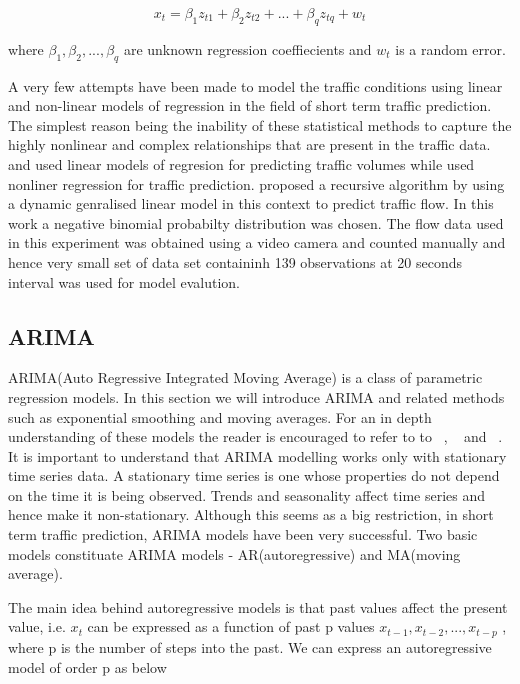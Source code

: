         \begin{equation}
            x_{t} = \beta_{1}z_{t1} + \beta_{2}z_{t2} + ... + \beta_{q}z_{tq} + w_{t}
        \end{equation}

where $ \beta_{1}, \beta_{2},...,\beta_{q} $ are unknown regression coeffiecients and $w_{t}$ is
a random error.

A very few attempts have been made to model the traffic conditions using linear and non-linear
models of regression in the field of short term traffic prediction. The simplest reason being the
inability of these statistical methods to capture the highly nonlinear and complex relationships that
are present in the traffic data.
\citet{low1972new} and \citet{jensen1973calibrating} used linear models of regresion for predicting
traffic volumes while \citet{hogberg1976estimation} used nonliner regression for traffic prediction.
\citet{lan1999real} proposed a recursive algorithm by using a dynamic genralised linear model
in this context to predict traffic flow. In this work a negative binomial probabilty distribution
was chosen. The flow data used in this experiment was obtained using a video camera and counted
manually and hence very small set of data set containinh 139 observations at 20 seconds interval
was used for model evalution.

\subsection{ARIMA}
ARIMA(Auto Regressive Integrated Moving Average) is a class of parametric regression models. In
this section we will introduce ARIMA and related methods such as exponential smoothing and moving
averages. For an in depth understanding of these models the reader is encouraged to refer to to
~\citet{tong1990non}, ~\citet{brockwell2006introduction} and ~\citet{box2015time}. It is
important to understand that ARIMA modelling works only with stationary time series data. A
stationary time series is one whose properties do not depend on the time it is being observed.
Trends and seasonality affect time series and hence make it non-stationary. Although this seems as a
big restriction, in short term traffic prediction, ARIMA models have been very successful. Two
basic models constituate ARIMA models - AR(autoregressive) and MA(moving average).

The main idea behind autoregressive models is that past values affect the present value, i.e.
$x_{t}$ can be expressed as a function of past p values $ x_{t-1}, x_{t-2},...,x_{t-p} $ , where
p is the number of steps into the past. We can express an autoregressive model of order p as below

